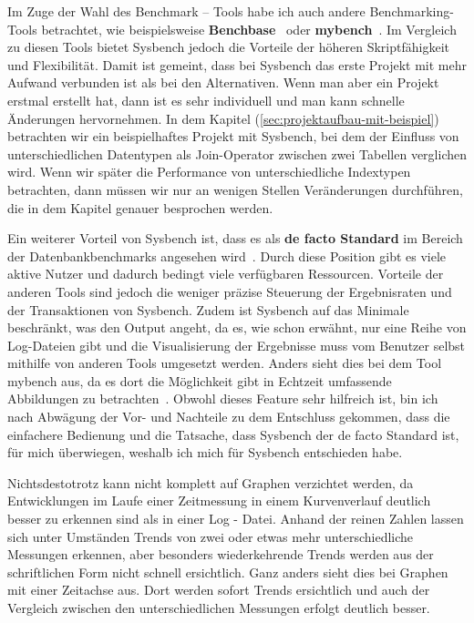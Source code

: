 Im Zuge der Wahl des Benchmark – Tools habe ich auch andere Benchmarking-Tools betrachtet, wie beispielsweise \textbf{Benchbase}~\cite{DifallahPCC13} oder \textbf{mybench}~\cite{mybench_repo}.
Im Vergleich zu diesen Tools bietet Sysbench jedoch die Vorteile der höheren Skriptfähigkeit und Flexibilität.
Damit ist gemeint, dass bei Sysbench das erste Projekt mit mehr Aufwand verbunden ist als bei den Alternativen.
Wenn man aber ein Projekt erstmal erstellt hat, dann ist es sehr individuell und man kann schnelle Änderungen hervornehmen.
In dem Kapitel (\ref{sec:projektaufbau-mit-beispiel}) betrachten wir ein beispielhaftes Projekt mit Sysbench, bei dem der Einfluss von unterschiedlichen Datentypen als Join-Operator zwischen zwei Tabellen verglichen wird.
Wenn wir später die Performance von unterschiedliche Indextypen betrachten, dann müssen wir nur an wenigen Stellen Veränderungen durchführen, die in dem Kapitel genauer besprochen werden.

Ein weiterer Vorteil von Sysbench ist, dass es als \textbf{de facto Standard} im Bereich der Datenbankbenchmarks angesehen wird~\cite{mybench_comparison}.
Durch diese Position gibt es viele aktive Nutzer und dadurch bedingt viele verfügbaren Ressourcen.
Vorteile der anderen Tools sind jedoch die weniger präzise Steuerung der Ergebnisraten und der Transaktionen von Sysbench.
Zudem ist Sysbench auf das Minimale beschränkt, was den Output angeht, da es, wie schon erwähnt, nur eine Reihe von Log-Dateien gibt und
die Visualisierung der Ergebnisse muss vom Benutzer selbst mithilfe von anderen Tools umgesetzt werden.
Anders sieht dies bei dem Tool mybench aus, da es dort die Möglichkeit gibt in Echtzeit umfassende Abbildungen zu betrachten~\cite{mybench_user_interface}.
Obwohl dieses Feature sehr hilfreich ist, bin ich nach Abwägung der Vor- und Nachteile zu dem Entschluss gekommen, dass die einfachere Bedienung und die Tatsache,
dass Sysbench der de facto Standard ist, für mich überwiegen, weshalb ich mich für Sysbench entschieden habe.

Nichtsdestotrotz kann nicht komplett auf Graphen verzichtet werden, da Entwicklungen im Laufe einer Zeitmessung in einem Kurvenverlauf deutlich besser zu erkennen sind als in einer Log - Datei.
Anhand der reinen Zahlen lassen sich unter Umständen Trends von zwei oder etwas mehr unterschiedliche Messungen erkennen, aber besonders wiederkehrende Trends werden aus der schriftlichen Form nicht schnell ersichtlich.
Ganz anders sieht dies bei Graphen mit einer Zeitachse aus.
Dort werden sofort Trends ersichtlich und auch der Vergleich zwischen den unterschiedlichen Messungen erfolgt deutlich besser.

